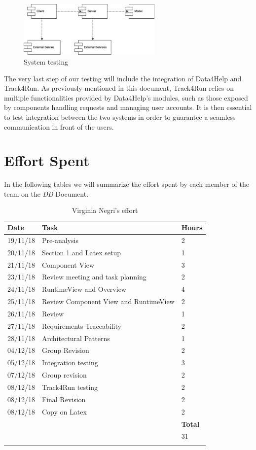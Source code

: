 \documentclass[titlepage]{article}
\begin{document}
\begin{figure}[H]
	\center
  	\includegraphics[width=7cm]{systemTesting.png}
  	\caption{System testing}
 	\label{fig:systemTesting}
\end{figure}
The very last step of our testing will include the integration of Data4Help and Track4Run. As previously mentioned in this document, Track4Run relies on multiple functionalities provided by Data4Help’s modules, such as those exposed by components handling requests and managing user accounts. It is then essential to test integration between the two systems in order to guarantee a seamless communication in front of the users.  
\pagebreak


\section{Effort Spent}

In the following tables we will summarize the effort spent by each member of the team on the {\it DD} Document.
		
		
	\begin{longtable}{| p{2 cm} | p{5 cm} | p{2 cm} |} 
			\hline
			{\bf Date} & {\bf Task} & {\bf Hours}\\
			\hline
			19/11/18 & Pre-analysis & 2 \\
			20/11/18 & Section 1 and Latex setup & 1\\
			21/11/18 & Component View & 3 \\
			23/11/18 & Review meeting and task planning & 2 \\
			24/11/18 & RuntimeView and Overview & 4 \\
			25/11/18 & Review Component View and RuntimeView & 2 \\
			26/11/18 & Review & 1 \\
			27/11/18 & Requirements Traceability & 2 \\
			28/11/18 & Architectural Patterns & 1 \\
			04/12/18 & Group Revision & 2\\
			05/12/18 & Integration testing & 3 \\
			07/12/18 & Group revision & 2 \\
			08/12/18 & Track4Run testing & 2 \\
			08/12/18 & Final Revision & 2 \\
			08/12/18 & Copy on Latex & 2 \\
			\hline
			& & {\bf Total} \\
			\hline
			& & 31 \\
			\hline
			\caption{Virginia Negri's effort}
		\end{longtable}
	
\end{document}
